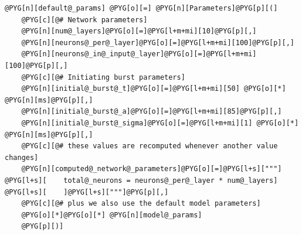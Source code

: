 \documentclass[letterpaper,10pt,english]{manual}
\begin{document}
\begin{Verbatim}[commandchars=@\[\]]
@PYG[n][default@_params] @PYG[o][=] @PYG[n][Parameters]@PYG[p][(]
    @PYG[c][@# Network parameters]
    @PYG[n][num@_layers]@PYG[o][=]@PYG[l+m+mi][10]@PYG[p][,]
    @PYG[n][neurons@_per@_layer]@PYG[o][=]@PYG[l+m+mi][100]@PYG[p][,]
    @PYG[n][neurons@_in@_input@_layer]@PYG[o][=]@PYG[l+m+mi][100]@PYG[p][,]
    @PYG[c][@# Initiating burst parameters]
    @PYG[n][initial@_burst@_t]@PYG[o][=]@PYG[l+m+mi][50] @PYG[o][*] @PYG[n][ms]@PYG[p][,]
    @PYG[n][initial@_burst@_a]@PYG[o][=]@PYG[l+m+mi][85]@PYG[p][,]
    @PYG[n][initial@_burst@_sigma]@PYG[o][=]@PYG[l+m+mi][1] @PYG[o][*] @PYG[n][ms]@PYG[p][,]
    @PYG[c][@# these values are recomputed whenever another value changes]
    @PYG[n][computed@_network@_parameters]@PYG[o][=]@PYG[l+s]["""]
@PYG[l+s][    total@_neurons = neurons@_per@_layer * num@_layers]
@PYG[l+s][    ]@PYG[l+s]["""]@PYG[p][,]
    @PYG[c][@# plus we also use the default model parameters]
    @PYG[o][*]@PYG[o][*] @PYG[n][model@_params]
    @PYG[p][)]


\end{Verbatim}
\end{document}
